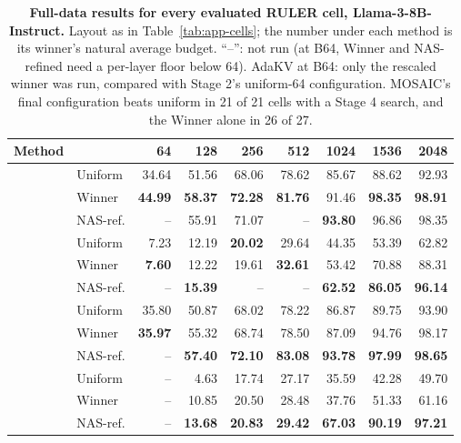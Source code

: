 \begin{table}[t]
  \centering
  \footnotesize
  \setlength{\tabcolsep}{14pt}
  \renewcommand{\arraystretch}{1.0}
\begin{tabular}{@{} c l rrrrrrr @{}}
  \toprule
  \textbf{Method} & & \textbf{64} & \textbf{128} & \textbf{256} & \textbf{512} & \textbf{1024} & \textbf{1536} & \textbf{2048} \\
  \midrule
   & Uniform & 34.64 & 51.56 & 68.06 & 78.62 & 85.67 & 88.62 & 92.93 \\
   & Winner & \textbf{44.99} & \textbf{58.37} & \textbf{72.28} & \textbf{81.76} & 91.46 & \textbf{98.35} & \textbf{98.91} \\
   & NAS-ref. & -- & 55.91 & 71.07 & -- & \textbf{93.80} & 96.86 & 98.35 \\
  \midrule
   & Uniform & 7.23 & 12.19 & \textbf{20.02} & 29.64 & 44.35 & 53.39 & 62.82 \\
   & Winner & \textbf{7.60} & 12.22 & 19.61 & \textbf{32.61} & 53.42 & 70.88 & 88.31 \\
   & NAS-ref. & -- & \textbf{15.39} & -- & -- & \textbf{62.52} & \textbf{86.05} & \textbf{96.14} \\
  \midrule
   & Uniform & 35.80 & 50.87 & 68.02 & 78.22 & 86.87 & 89.75 & 93.90 \\
   & Winner & \textbf{35.97} & 55.32 & 68.74 & 78.50 & 87.09 & 94.76 & 98.17 \\
   & NAS-ref. & -- & \textbf{57.40} & \textbf{72.10} & \textbf{83.08} & \textbf{93.78} & \textbf{97.99} & \textbf{98.65} \\
  \midrule
   & Uniform & -- & 4.63 & 17.74 & 27.17 & 35.59 & 42.28 & 49.70 \\
   & Winner & -- & 10.85 & 20.50 & 28.48 & 37.76 & 51.33 & 61.16 \\
   & NAS-ref. & -- & \textbf{13.68} & \textbf{20.83} & \textbf{29.42} & \textbf{67.03} & \textbf{90.19} & \textbf{97.21} \\
  \bottomrule
\end{tabular}
  \caption{\textbf{Full-data results for every evaluated RULER cell, Llama-3-8B-Instruct.} Layout as in Table~\ref{tab:app-cells}; the number under each method is its winner's natural average budget. ``--'': not run (at B64, Winner and NAS-refined need a per-layer floor below 64). AdaKV at B64: only the rescaled winner was run, compared with Stage 2's uniform-64 configuration. MOSAIC's final configuration beats uniform in 21 of 21 cells with a Stage 4 search, and the Winner alone in 26 of 27.}
  \label{tab:app-cells-ruler}
\end{table}


